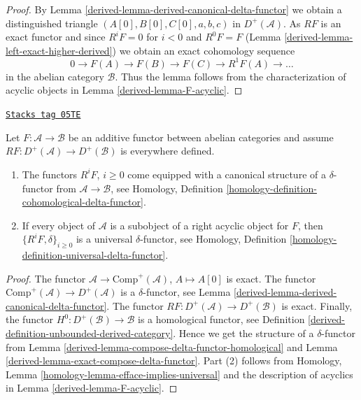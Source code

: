 \begin{proof}

By
Lemma \ref{derived-lemma-derived-canonical-delta-functor}
we obtain a distinguished triangle
$(A[0], B[0], C[0], a, b, c)$ in $D^{+}(\mathcal{A})$.
As $RF$ is an exact functor and since
$R^iF = 0$ for $i < 0$ and $R^0F = F$
(Lemma \ref{derived-lemma-left-exact-higher-derived})
we obtain an exact cohomology sequence
$$
0 \to F(A) \to F(B) \to F(C) \to R^1F(A) \to \ldots
$$
in the abelian category $\mathcal{B}$. Thus the lemma follows from
the characterization of acyclic objects in
Lemma \ref{derived-lemma-F-acyclic}.
\end{proof}

\begin{lemma}
\label{derived-lemma-right-derived-delta-functor}
\href{https://stacks.math.columbia.edu/tag/05TE}{\texttt{Stacks tag 05TE}}

Let $F : \mathcal{A} \to \mathcal{B}$ be an additive functor
between abelian categories and assume
$RF : D^{+}(\mathcal{A}) \to D^{+}(\mathcal{B})$ is everywhere defined.
\begin{enumerate}
\item The functors $R^iF$, $i \geq 0$ come equipped with a canonical
structure of a $\delta$-functor from $\mathcal{A} \to \mathcal{B}$, see
Homology, Definition \ref{homology-definition-cohomological-delta-functor}.
\item If every object of $\mathcal{A}$ is a subobject of a right
acyclic object for $F$, then $\{R^iF, \delta\}_{i \geq 0}$ is a
universal $\delta$-functor, see
Homology, Definition \ref{homology-definition-universal-delta-functor}.
\end{enumerate}
\end{lemma}

\begin{proof}

The functor $\mathcal{A} \to \text{Comp}^{+}(\mathcal{A})$,
$A \mapsto A[0]$ is exact. The functor
$\text{Comp}^{+}(\mathcal{A}) \to D^{+}(\mathcal{A})$
is a $\delta$-functor, see
Lemma \ref{derived-lemma-derived-canonical-delta-functor}.
The functor $RF : D^{+}(\mathcal{A}) \to D^{+}(\mathcal{B})$ is exact.
Finally, the functor $H^0 : D^{+}(\mathcal{B}) \to \mathcal{B}$
is a homological functor, see
Definition \ref{derived-definition-unbounded-derived-category}.
Hence we get the structure of a $\delta$-functor from
Lemma \ref{derived-lemma-compose-delta-functor-homological}
and
Lemma \ref{derived-lemma-exact-compose-delta-functor}.
Part (2) follows from
Homology, Lemma \ref{homology-lemma-efface-implies-universal}
and the description of acyclics in
Lemma \ref{derived-lemma-F-acyclic}.
\end{proof}

